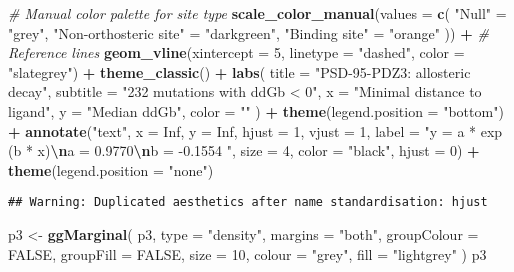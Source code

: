\documentclass[
]{article}
\newenvironment{Shaded}{\begin{snugshade}}{\end{snugshade}}
\newcommand{\AttributeTok}[1]{\textcolor[rgb]{0.13,0.29,0.53}{#1}}
\newcommand{\CommentTok}[1]{\textcolor[rgb]{0.56,0.35,0.01}{\textit{#1}}}
\newcommand{\ConstantTok}[1]{\textcolor[rgb]{0.56,0.35,0.01}{#1}}
\newcommand{\DecValTok}[1]{\textcolor[rgb]{0.00,0.00,0.81}{#1}}
\newcommand{\FunctionTok}[1]{\textcolor[rgb]{0.13,0.29,0.53}{\textbf{#1}}}
\newcommand{\NormalTok}[1]{#1}
\newcommand{\OtherTok}[1]{\textcolor[rgb]{0.56,0.35,0.01}{#1}}
\newcommand{\SpecialCharTok}[1]{\textcolor[rgb]{0.81,0.36,0.00}{\textbf{#1}}}
\newcommand{\StringTok}[1]{\textcolor[rgb]{0.31,0.60,0.02}{#1}}
\begin{document}
\begin{Shaded}
\begin{Highlighting}[]
  \CommentTok{\# Manual color palette for site type}
  \FunctionTok{scale\_color\_manual}\NormalTok{(}\AttributeTok{values =} \FunctionTok{c}\NormalTok{(}
    \StringTok{"Null"} \OtherTok{=} \StringTok{"grey"}\NormalTok{,}
    \StringTok{"Non{-}orthosteric site"} \OtherTok{=} \StringTok{"darkgreen"}\NormalTok{,}
    \StringTok{"Binding site"} \OtherTok{=} \StringTok{"orange"}
\NormalTok{  )) }\SpecialCharTok{+}
  \CommentTok{\# Reference lines}
  \FunctionTok{geom\_vline}\NormalTok{(}\AttributeTok{xintercept =} \DecValTok{5}\NormalTok{, }\AttributeTok{linetype =} \StringTok{"dashed"}\NormalTok{, }\AttributeTok{color =} \StringTok{"slategrey"}\NormalTok{) }\SpecialCharTok{+}
  \FunctionTok{theme\_classic}\NormalTok{() }\SpecialCharTok{+}
  \FunctionTok{labs}\NormalTok{(}
    \AttributeTok{title =} \StringTok{"PSD{-}95{-}PDZ3: allosteric decay"}\NormalTok{,}
    \AttributeTok{subtitle =} \StringTok{"232 mutations with ddGb \textless{} 0"}\NormalTok{,}
    \AttributeTok{x =} \StringTok{"Minimal distance to ligand"}\NormalTok{,}
    \AttributeTok{y =} \StringTok{"Median ddGb"}\NormalTok{,}
    \AttributeTok{color =} \StringTok{""}
\NormalTok{  )  }\SpecialCharTok{+} \FunctionTok{theme}\NormalTok{(}\AttributeTok{legend.position =} \StringTok{"bottom"}\NormalTok{) }\SpecialCharTok{+}
    \FunctionTok{annotate}\NormalTok{(}\StringTok{"text"}\NormalTok{,  }\AttributeTok{x =} \ConstantTok{Inf}\NormalTok{, }\AttributeTok{y =} \ConstantTok{Inf}\NormalTok{,}
             \AttributeTok{hjust =} \DecValTok{1}\NormalTok{, }\AttributeTok{vjust =} \DecValTok{1}\NormalTok{,}
           \AttributeTok{label =} \StringTok{"y = a * exp (b * x)}\SpecialCharTok{\textbackslash{}n}\StringTok{a =  0.9770}\SpecialCharTok{\textbackslash{}n}\StringTok{b = {-}0.1554 "}\NormalTok{,}
           \AttributeTok{size =} \DecValTok{4}\NormalTok{, }\AttributeTok{color =} \StringTok{"black"}\NormalTok{, }\AttributeTok{hjust =} \DecValTok{0}\NormalTok{) }\SpecialCharTok{+} \FunctionTok{theme}\NormalTok{(}\AttributeTok{legend.position =} \StringTok{"none"}\NormalTok{)}
\end{Highlighting}
\end{Shaded}

\begin{verbatim}
## Warning: Duplicated aesthetics after name standardisation: hjust
\end{verbatim}

\begin{Shaded}
\begin{Highlighting}[]
\NormalTok{p3 }\OtherTok{\textless{}{-}} \FunctionTok{ggMarginal}\NormalTok{(}
\NormalTok{  p3,}
  \AttributeTok{type =} \StringTok{"density"}\NormalTok{,}
  \AttributeTok{margins =} \StringTok{"both"}\NormalTok{,}
  \AttributeTok{groupColour =} \ConstantTok{FALSE}\NormalTok{,}
  \AttributeTok{groupFill =} \ConstantTok{FALSE}\NormalTok{,}
  \AttributeTok{size =} \DecValTok{10}\NormalTok{,}
  \AttributeTok{colour =} \StringTok{"grey"}\NormalTok{,}
  \AttributeTok{fill =} \StringTok{"lightgrey"}
\NormalTok{)}
\NormalTok{p3}
\end{Highlighting}
\end{Shaded}
\end{document}
